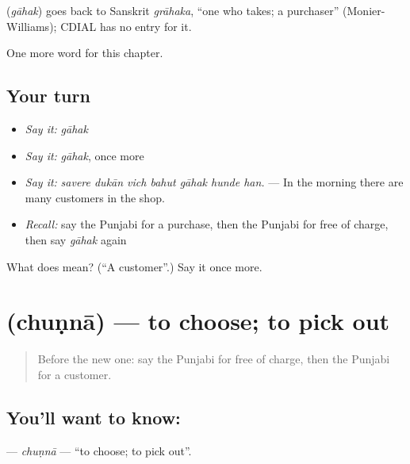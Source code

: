\begin{cousinweb}
\textbf{} (\emph{gāhak}) goes back to Sanskrit \emph{grāhaka}, \textquotedblleft{}one who takes; a purchaser\textquotedblright{} (Monier-Williams); CDIAL has no entry for it.
\end{cousinweb}

\begin{grammarlens}[title={What you've built}]
One more word for this chapter.
\end{grammarlens}

\subsection*{Your turn}
\begin{itemize}
\raggedright
  \item \emph{Say it:} \emph{gāhak}
  \item \emph{Say it:} \emph{gāhak}, once more
  \item \emph{Say it:} \emph{savere dukān vich bahut gāhak hunde han.} — In the morning there are many customers in the shop.
  \item \emph{Recall:} say the Punjabi for a purchase, then the Punjabi for free of charge, then say \emph{gāhak} again
\end{itemize}

\begin{tcolorbox}[breakable,colback=teal!4,colframe=teal!35!black,title={Before you move on}]
What does  mean? (\textquotedblleft{}A customer\textquotedblright{}.) Say it once more.
\end{tcolorbox}
\section[\texorpdfstring{\pa{ਚੁਣਨਾ} (chuṇnā)}{ਚੁਣਨਾ (chuṇnā)}]{ (chuṇnā) — to choose; to pick out}

\label{lesson:PA-C277-chunna}



\begin{quote}
Before the new one: say the Punjabi for free of charge, then the Punjabi for a customer.
\end{quote}

\subsection*{You'll want to know: }
\textbf{} — \emph{chuṇnā} — \textquotedblleft{}to choose; to pick out\textquotedblright{}.

